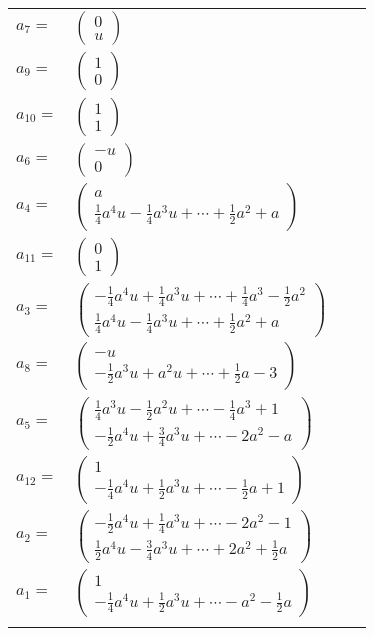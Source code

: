 \documentclass[1p]{elsarticle_modified}
\theoremstyle{definition}
\begin{document}
\begin{tabular}{m{7pt} m{180pt} m{7pt} m{180pt} }
\flushright $a_{7}=$&$\begin{pmatrix}0\\u\end{pmatrix}$ \\
\flushright $a_{9}=$&$\begin{pmatrix}1\\0\end{pmatrix}$ \\
\flushright $a_{10}=$&$\begin{pmatrix}1\\1\end{pmatrix}$ \\
\flushright $a_{6}=$&$\begin{pmatrix}- u\\0\end{pmatrix}$ \\
\flushright $a_{4}=$&$\begin{pmatrix}a\\\frac{1}{4} a^4 u-\frac{1}{4} a^3 u+\cdots+\frac{1}{2} a^2+a\end{pmatrix}$ \\
\flushright $a_{11}=$&$\begin{pmatrix}0\\1\end{pmatrix}$ \\
\flushright $a_{3}=$&$\begin{pmatrix}-\frac{1}{4} a^4 u+\frac{1}{4} a^3 u+\cdots+\frac{1}{4} a^3-\frac{1}{2} a^2\\\frac{1}{4} a^4 u-\frac{1}{4} a^3 u+\cdots+\frac{1}{2} a^2+a\end{pmatrix}$ \\
\flushright $a_{8}=$&$\begin{pmatrix}- u\\-\frac{1}{2} a^3 u+a^2 u+\cdots+\frac{1}{2} a-3\end{pmatrix}$ \\
\flushright $a_{5}=$&$\begin{pmatrix}\frac{1}{4} a^3 u-\frac{1}{2} a^2 u+\cdots-\frac{1}{4} a^3+1\\-\frac{1}{2} a^4 u+\frac{3}{4} a^3 u+\cdots-2 a^2- a\end{pmatrix}$ \\
\flushright $a_{12}=$&$\begin{pmatrix}1\\-\frac{1}{4} a^4 u+\frac{1}{2} a^3 u+\cdots-\frac{1}{2} a+1\end{pmatrix}$ \\
\flushright $a_{2}=$&$\begin{pmatrix}-\frac{1}{2} a^4 u+\frac{1}{4} a^3 u+\cdots-2 a^2-1\\\frac{1}{2} a^4 u-\frac{3}{4} a^3 u+\cdots+2 a^2+\frac{1}{2} a\end{pmatrix}$ \\
\flushright $a_{1}=$&$\begin{pmatrix}1\\-\frac{1}{4} a^4 u+\frac{1}{2} a^3 u+\cdots- a^2-\frac{1}{2} a\end{pmatrix}$\\&\end{tabular}
\end{document}
